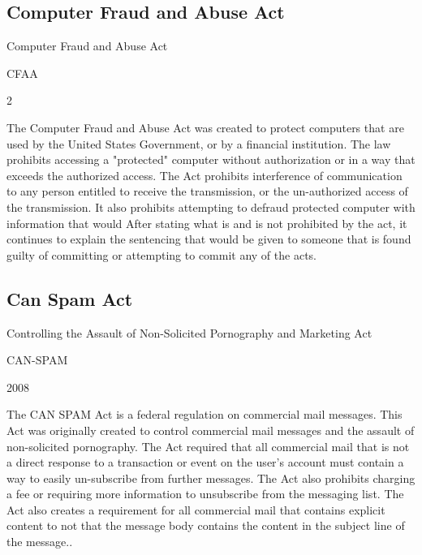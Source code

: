 \documentclass[14pt]{article}
\begin{document}
\subsection{Computer Fraud and Abuse Act}
    \begin{description}[leftmargin=!, labelwidth=\widthof{\bfseries Year Approved}]
        \item [Name] Computer Fraud and Abuse Act
        \item [Abbreviation] CFAA
        \item [Year Approved] 2
        \item [Description]The Computer Fraud and Abuse Act was created to protect computers that are used by the United States Government, or by a financial institution. The law prohibits accessing a "protected" computer without authorization or in a way that exceeds the authorized access. The Act prohibits interference of communication to any person entitled to receive the transmission, or the un-authorized access of the transmission. It also prohibits attempting to defraud protected computer with information that would  After stating what is and is not prohibited by the act, it continues to explain the sentencing that would be given to someone that is found guilty of committing or attempting to commit any of the acts. \cite{CFAA}
    \end{description}
\subsection{Can Spam Act}
    \begin{description}[leftmargin=!, labelwidth=\widthof{\bfseries Year Approved}]
        \item [Name] Controlling the Assault of Non-Solicited Pornography and Marketing Act
        \item [Abbreviation] CAN-SPAM
        \item [Year Approved] 2008
        \item [Description] The CAN SPAM Act is a federal regulation on commercial mail messages. This Act was originally created to control commercial mail messages and the assault of non-solicited pornography. The Act required that all commercial mail that is not a direct response to a transaction or event on the user's account must contain a way to easily un-subscribe from further messages. The Act also prohibits charging a fee or requiring more information to unsubscribe from the messaging list. The Act also creates a requirement for all commercial mail that contains explicit content to not that the message body contains the content in the subject line of the message.\cite{CANSPAM}.
    \end{description}
    
\end{document}
